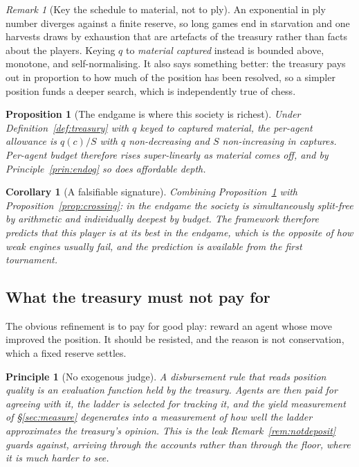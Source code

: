 \documentclass[11pt,a4paper]{article}
\theoremstyle{plain}
\newtheorem{proposition}[theorem]{Proposition}
\newtheorem{corollary}[theorem]{Corollary}
\newtheorem{principle}[theorem]{Principle}
\theoremstyle{definition}
\theoremstyle{remark}
\newtheorem{remark}[theorem]{Remark}
\begin{document}
\begin{remark}[Key the schedule to material, not to ply]
\label{rem:schedule}
An exponential in ply number diverges against a finite reserve, so long games
end in starvation and one harvests draws by exhaustion that are artefacts of the
treasury rather than facts about the players. Keying $q$ to \emph{material
captured} instead is bounded above, monotone, and self-normalising. It also says
something better: the treasury pays out in proportion to how much of the
position has been resolved, so a simpler position funds a deeper search, which
is independently true of chess.
\end{remark}

\begin{proposition}[The endgame is where this society is richest]
\label{prop:richest}
Under Definition~\ref{def:treasury} with $q$ keyed to captured material, the
per-agent allowance is $q(c)/S$ with $q$ non-decreasing and $S$ non-increasing
in captures. Per-agent budget therefore rises super-linearly as material comes
off, and by Principle~\ref{prin:endog} so does affordable depth.
\end{proposition}

\begin{corollary}[A falsifiable signature]
\label{cor:signature}
Combining Proposition~\ref{prop:richest} with
Proposition~\ref{prop:crossing}: in the endgame the society is simultaneously
split-free by arithmetic and individually deepest by budget. The framework
therefore predicts that this player is at its \emph{best} in the endgame, which
is the opposite of how weak engines usually fail, and the prediction is
available from the first tournament.
\end{corollary}

\subsection{What the treasury must not pay for}
\label{sec:notpay}

The obvious refinement is to pay for good play: reward an agent whose move
improved the position. It should be resisted, and the reason is not
conservation, which a fixed reserve settles.

\begin{principle}[No exogenous judge]
\label{prin:nojudge}
A disbursement rule that reads position quality is an evaluation function held
by the treasury. Agents are then paid for agreeing with it, the ladder is
selected for tracking it, and the yield measurement of \S\ref{sec:measure}
degenerates into a measurement of how well the ladder approximates the
treasury's opinion. This is the leak Remark~\ref{rem:notdeposit} guards against,
arriving through the accounts rather than through the floor, where it is much
harder to see.
\end{principle}
\end{document}
